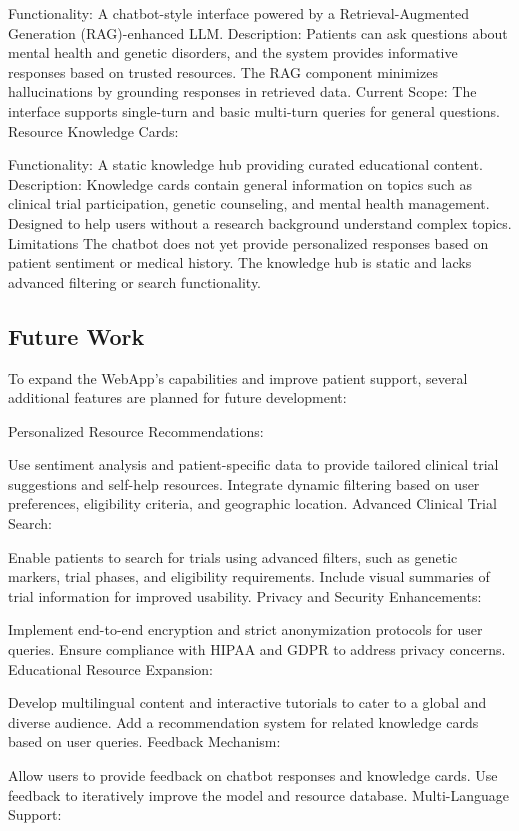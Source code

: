 \documentclass{article} %
\begin{document}
Functionality: A chatbot-style interface powered by a Retrieval-Augmented Generation (RAG)-enhanced LLM.
Description:
Patients can ask questions about mental health and genetic disorders, and the system provides informative responses based on trusted resources.
The RAG component minimizes hallucinations by grounding responses in retrieved data.
Current Scope: The interface supports single-turn and basic multi-turn queries for general questions.
Resource Knowledge Cards:

Functionality: A static knowledge hub providing curated educational content.
Description:
Knowledge cards contain general information on topics such as clinical trial participation, genetic counseling, and mental health management.
Designed to help users without a research background understand complex topics.
Limitations
The chatbot does not yet provide personalized responses based on patient sentiment or medical history.
The knowledge hub is static and lacks advanced filtering or search functionality.

\subsection{Future Work}

To expand the WebApp's capabilities and improve patient support, several additional features are planned for future development:

Personalized Resource Recommendations:

Use sentiment analysis and patient-specific data to provide tailored clinical trial suggestions and self-help resources.
Integrate dynamic filtering based on user preferences, eligibility criteria, and geographic location.
Advanced Clinical Trial Search:

Enable patients to search for trials using advanced filters, such as genetic markers, trial phases, and eligibility requirements.
Include visual summaries of trial information for improved usability.
Privacy and Security Enhancements:

Implement end-to-end encryption and strict anonymization protocols for user queries.
Ensure compliance with HIPAA and GDPR to address privacy concerns.
Educational Resource Expansion:

Develop multilingual content and interactive tutorials to cater to a global and diverse audience.
Add a recommendation system for related knowledge cards based on user queries.
Feedback Mechanism:

Allow users to provide feedback on chatbot responses and knowledge cards.
Use feedback to iteratively improve the model and resource database.
Multi-Language Support:
\end{document}
